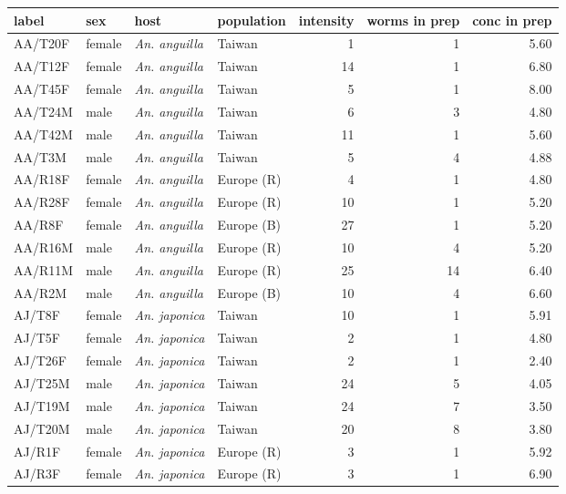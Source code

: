 \begin{table}[h]
\begin{center}
\begin{tabular}{llllrrr}
  \hline
label & sex & host & population & intensity & worms in prep & conc in prep \\ 
  \hline
AA/T20F & female & \textit{An. anguilla} & Taiwan & 1 & 1 & 5.60 \\ 
  AA/T12F & female & \textit{An. anguilla} & Taiwan & 14 & 1 & 6.80 \\ 
  AA/T45F & female & \textit{An. anguilla} & Taiwan & 5 & 1 & 8.00 \\ 
  AA/T24M & male & \textit{An. anguilla} & Taiwan & 6 & 3 & 4.80 \\ 
  AA/T42M & male & \textit{An. anguilla} & Taiwan & 11 & 1 & 5.60 \\ 
  AA/T3M & male & \textit{An. anguilla} & Taiwan & 5 & 4 & 4.88 \\ 
  AA/R18F & female & \textit{An. anguilla} & Europe (R) & 4 & 1 & 4.80 \\ 
  AA/R28F & female & \textit{An. anguilla} & Europe (R) & 10 & 1 & 5.20 \\ 
  AA/R8F & female & \textit{An. anguilla} & Europe (B) & 27 & 1 & 5.20 \\ 
  AA/R16M & male & \textit{An. anguilla} & Europe (R) & 10 & 4 & 5.20 \\ 
  AA/R11M & male & \textit{An. anguilla} & Europe (R) & 25 & 14 & 6.40 \\ 
  AA/R2M & male & \textit{An. anguilla} & Europe (B) & 10 & 4 & 6.60 \\ 
  AJ/T8F & female & \textit{An. japonica} & Taiwan & 10 & 1 & 5.91 \\ 
  AJ/T5F & female & \textit{An. japonica} & Taiwan & 2 & 1 & 4.80 \\ 
  AJ/T26F & female & \textit{An. japonica} & Taiwan & 2 & 1 & 2.40 \\ 
  AJ/T25M & male & \textit{An. japonica} & Taiwan & 24 & 5 & 4.05 \\ 
  AJ/T19M & male & \textit{An. japonica} & Taiwan & 24 & 7 & 3.50 \\ 
  AJ/T20M & male & \textit{An. japonica} & Taiwan & 20 & 8 & 3.80 \\ 
  AJ/R1F & female & \textit{An. japonica} & Europe (R) & 3 & 1 & 5.92 \\ 
  AJ/R3F & female & \textit{An. japonica} & Europe (R) & 3 & 1 & 6.90 \\ 

\end{tabular}
\end{center}
\end{table}
